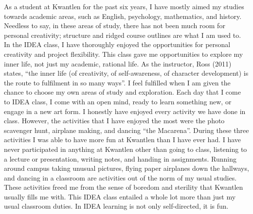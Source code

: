 \documentclass[letterpaper,10pt,headsepline]{scrreprt}
\begin{document}
As a student at Kwantlen for the past six years, I have mostly aimed my studies towards academic areas, such as English, psychology, mathematics, and history. Needless to say, in these areas of study, there has not been much room for personal creativity; structure and ridged course outlines are what I am used to. In the IDEA class, I have thoroughly enjoyed the opportunities for personal creativity and project flexibility. This class gave me opportunities to explore my inner life, not just my academic, rational life. As the instructor, Ross (2011) states, “the inner life (of creativity, of self-awareness, of character development) is the route to fulfilment in so many ways”. I feel fulfilled when I am given the chance to choose my own areas of study and exploration. Each day that I come to IDEA class, I come with an open mind, ready to learn something new, or engage in a new art form. I honestly have enjoyed every activity we have done in class. However, the activities that I have enjoyed the most were the photo scavenger hunt, airplane making, and dancing “the Macarena”. During these three activities I was able to have more fun at Kwantlen than I have ever had. I have never participated in anything at Kwantlen other than going to class, listening to a lecture or presentation, writing notes, and handing in assignments. Running around campus taking unusual pictures, flying paper airplanes down the hallways, and dancing in a classroom are activities out of the norm of my usual studies. These activities freed me from the sense of boredom and sterility that Kwantlen usually fills me with. This IDEA class entailed a whole lot more than just my usual classroom duties. In IDEA learning is not only self-directed, it is fun.
\end{document}
